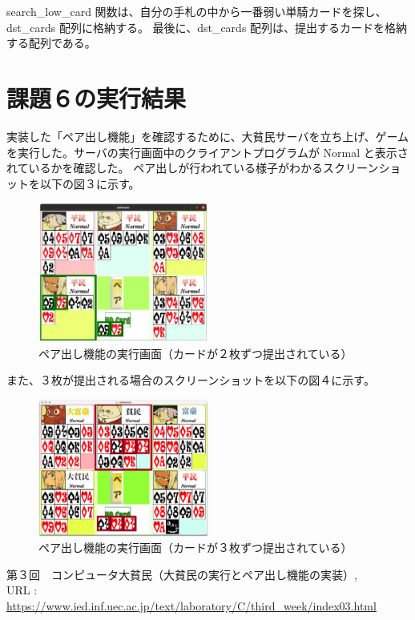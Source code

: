 \documentclass[]{jsarticle}
\begin{document}
search\_low\_card 関数は、自分の手札の中から一番弱い単騎カードを探し、dst\_cards 配列に格納する。
最後に、dst\_cards 配列は、提出するカードを格納する配列である。\\

\newpage
\section*{課題６の実行結果}
実装した「ペア出し機能」を確認するために、大貧民サーバを立ち上げ、ゲームを実行した。サーバの実行画面中のクライアントプログラムが Normal と表示されているかを確認した。
ペア出しが行われている様子がわかるスクリーンショットを以下の図３に示す。
\begin{figure}[h]
  \centering
  \includegraphics[width=0.5\textwidth]{kadai6/double.png}
  \caption{ペア出し機能の実行画面（カードが２枚ずつ提出されている）}
\end{figure}

また、３枚が提出される場合のスクリーンショットを以下の図４に示す。
\begin{figure}[h]
  \centering
  \includegraphics[width=0.5\textwidth]{kadai6/1.jpg}
  \caption{ペア出し機能の実行画面（カードが３枚ずつ提出されている）}
\end{figure}

\newpage
\begin{thebibliography}{99}
   第３回　コンピュータ大貧民（大貧民の実行とペア出し機能の実装）, \\URL : \url{https://www.ied.inf.uec.ac.jp/text/laboratory/C/third_week/index03.html}
\end{thebibliography}
\end{document}
